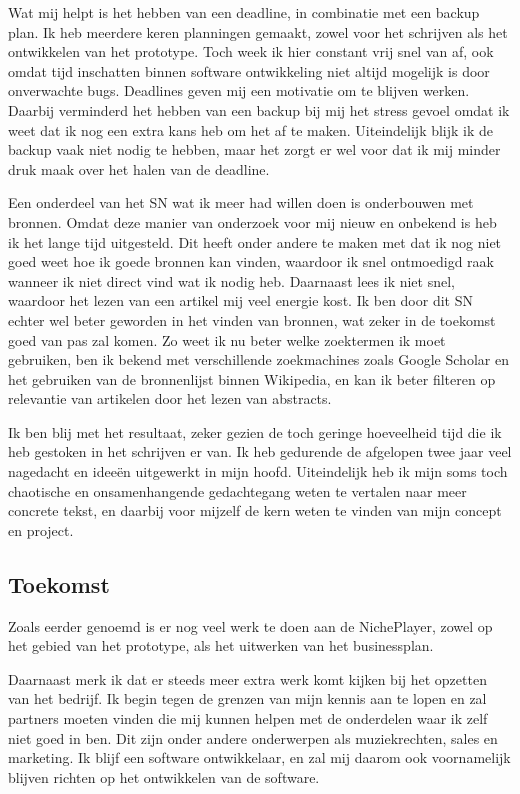 Wat mij helpt is het hebben van een deadline, in combinatie met een backup plan. Ik heb meerdere keren planningen gemaakt, zowel voor het schrijven als het ontwikkelen van het prototype. Toch week ik hier constant vrij snel van af, ook omdat tijd inschatten binnen software ontwikkeling niet altijd mogelijk is door onverwachte bugs. Deadlines geven mij een motivatie om te blijven werken. Daarbij verminderd het hebben van een backup bij mij het stress gevoel omdat ik weet dat ik nog een extra kans heb om het af te maken. Uiteindelijk blijk ik de backup vaak niet nodig te hebben, maar het zorgt er wel voor dat ik mij minder druk maak over het halen van de deadline.

Een onderdeel van het SN wat ik meer had willen doen is onderbouwen met bronnen. Omdat deze manier van onderzoek voor mij nieuw en onbekend is heb ik het lange tijd uitgesteld. Dit heeft onder andere te maken met dat ik nog niet goed weet hoe ik goede bronnen kan vinden, waardoor ik snel ontmoedigd raak wanneer ik niet direct vind wat ik nodig heb. Daarnaast lees ik niet snel, waardoor het lezen van een artikel mij veel energie kost. Ik ben door dit SN echter wel beter geworden in het vinden van bronnen, wat zeker in de toekomst goed van pas zal komen. Zo weet ik nu beter welke zoektermen ik moet gebruiken, ben ik bekend met verschillende zoekmachines zoals Google Scholar en het gebruiken van de bronnenlijst binnen Wikipedia, en kan ik beter filteren op relevantie van artikelen door het lezen van abstracts.

Ik ben blij met het resultaat, zeker gezien de toch geringe hoeveelheid tijd die ik heb gestoken in het schrijven er van. Ik heb gedurende de afgelopen twee jaar veel nagedacht en ideeën uitgewerkt in mijn hoofd. Uiteindelijk heb ik mijn soms toch chaotische en onsamenhangende gedachtegang weten te vertalen naar meer concrete tekst, en daarbij voor mijzelf de kern weten te vinden van mijn concept en project.

\subsection{Toekomst}
Zoals eerder genoemd is er nog veel werk te doen aan de NichePlayer, zowel op het gebied van het prototype, als het uitwerken van het businessplan.

Daarnaast merk ik dat er steeds meer extra werk komt kijken bij het opzetten van het bedrijf. Ik begin tegen de grenzen van mijn kennis aan te lopen en zal partners moeten vinden die mij kunnen helpen met de onderdelen waar ik zelf niet goed in ben. Dit zijn onder andere onderwerpen als muziekrechten, sales en marketing. Ik blijf een software ontwikkelaar, en zal mij daarom ook voornamelijk blijven richten op het ontwikkelen van de software.


